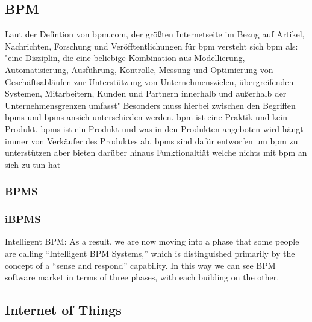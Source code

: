 \documentclass[a4paper, 12pt, twoside, headsepline=true]{scrartcl} %
\begin{document}
\subsection{BPM}
Laut der Defintion von bpm.com, der größten Internetseite im Bezug auf Artikel, Nachrichten, Forschung und Veröfftentlichungen für \ac{bpm} \cite{aboutbpmcom} versteht sich \ac{bpm} als: "eine Disziplin, die eine beliebige Kombination aus Modellierung, Automatisierung, Ausführung, Kontrolle, Messung und Optimierung von Geschäftsabläufen zur Unterstützung von Unternehmenszielen, übergreifenden Systemen, Mitarbeitern, Kunden und Partnern innerhalb und außerhalb der Unternehmensgrenzen umfasst"\cite{whatisbpm}
Besonders muss hierbei zwischen den Begriffen \ac{bpms} und \ac{bpms} ansich unterschieden werden. \ac{bpm} ist eine Praktik und kein Produkt. \ac{bpms} ist ein Produkt und was in den Produkten angeboten wird hängt immer von Verkäufer des Produktes ab. \ac{bpms} sind dafür entworfen um \ac{bpm} zu unterstützen aber bieten darüber hinaus Funktionaltiät welche nichts mit \ac{bpm} an sich zu tun hat

\subsubsection{BPMS}

\subsubsection{iBPMS}

Intelligent BPM:
As a result, we are now moving into a phase that some people are calling “Intelligent BPM Systems,” which is distinguished primarily by the concept of a “sense and respond” capability.   In this way we can see BPM software market in terms of three phases, with each building on the other.

\subsection{Internet of Things}
\end{document}

